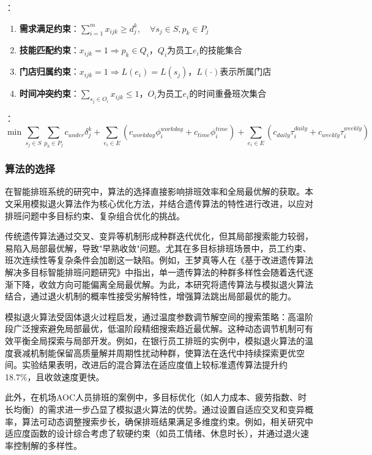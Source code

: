{}：
\begin{enumerate}
    \item \textbf{需求满足约束}：$\sum_{i=1}^m x_{ijk} \geq d_j^k,\quad \forall s_j \in S, p_k \in P_j$
    \item \textbf{技能匹配约束}：$x_{ijk} = 1 \Rightarrow p_k \in Q_i$，$Q_i$为员工$e_i$的技能集合
    \item \textbf{门店归属约束}：$x_{ijk} = 1 \Rightarrow L(e_i) = L(s_j)$，$L(\cdot)$表示所属门店
    \item \textbf{时间冲突约束}：$\sum_{s_j \in O_i} x_{ijk} \leq 1$，$O_i$为员工$e_i$的时间重叠班次集合
\end{enumerate}

{}：
\begin{equation}
\min \sum_{s_j \in S}\sum_{p_k \in P_j} c_{under}\delta_j^k + 
\sum_{e_i \in E}\left(c_{workday}\phi_i^{workday} + c_{time}\phi_i^{time}\right) +
\sum_{e_i \in E}\left(c_{daily}\tau_i^{daily} + c_{weekly}\tau_i^{weekly}\right)
\end{equation}

\subsubsection{算法的选择}
在智能排班系统的研究中，算法的选择直接影响排班效率和全局最优解的获取。本文采用模拟退火算法作为核心优化方法，并结合遗传算法的特性进行改进，以应对排班问题中多目标约束、复杂组合优化的挑战。

传统遗传算法通过交叉、变异等机制形成种群迭代优化，但其局部搜索能力较弱，易陷入局部最优解，导致"早熟收敛"问题。尤其在多目标排班场景中，员工约束、班次连续性等复杂条件会加剧这一缺陷。例如，王梦真等人在《基于改进遗传算法解决多目标智能排班问题研究》中指出，单一遗传算法的种群多样性会随着迭代逐渐下降，收敛方向可能偏离全局最优解\cite{DNZS202202029}。为此，本研究将遗传算法与模拟退火算法结合，通过退火机制的概率性接受劣解特性，增强算法跳出局部最优的能力。

模拟退火算法受固体退火过程启发，通过温度参数调节解空间的搜索策略：高温阶段广泛搜索避免局部最优，低温阶段精细搜索趋近最优解\cite{RJDK202301028}。这种动态调节机制可有效平衡全局探索与局部开发。例如，在银行员工排班的实例中，模拟退火算法的温度衰减机制能保留高质量解并周期性扰动种群，使算法在迭代中持续探索更优空间\cite{1016015859.nh}。实验结果表明，改进后的混合算法在适应度值上较标准遗传算法提升约18.7\%，且收敛速度更快\cite{DNZS202202029}。

此外，在机场AOC人员排班的案例中，多目标优化（如人力成本、疲劳指数、时长均衡）的需求进一步凸显了模拟退火算法的优势。通过设置自适应交叉和变异概率，算法可动态调整搜索步长，确保排班结果满足多维度约束\cite{1022506340.nh}。例如，相关研究中适应度函数的设计综合考虑了软硬约束（如员工情绪、休息时长），并通过退火速率控制解的多样性。

